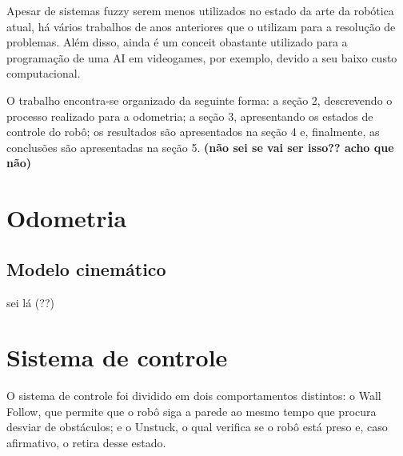 \documentclass[twoside,conference,a4paper]{IEEEtran}
\begin{document}
Apesar de sistemas fuzzy serem menos utilizados no estado da arte da robótica atual, há vários trabalhos de anos anteriores que o utilizam para a resolução de problemas. Além disso, ainda é um conceit obastante utilizado para a programação de uma AI em videogames, por exemplo, devido a seu baixo custo computacional.

O trabalho encontra-se organizado da seguinte forma: a seção 2, descrevendo o processo realizado para a odometria; a seção 3, apresentando os estados de controle do robô; os resultados são apresentados na seção 4 e, finalmente, as conclusões são apresentadas na seção 5. \textbf{(não sei se vai ser isso?? acho que não)}




\section{Odometria}

\subsection{Modelo cinemático}

sei lá (??)

\section{Sistema de controle}

O sistema de controle foi dividido em dois comportamentos distintos: o Wall Follow, que permite que o robô siga a parede ao mesmo tempo que procura desviar de obstáculos; e o Unstuck, o qual verifica se o robô está preso e, caso afirmativo, o retira desse estado.
\end{document}
